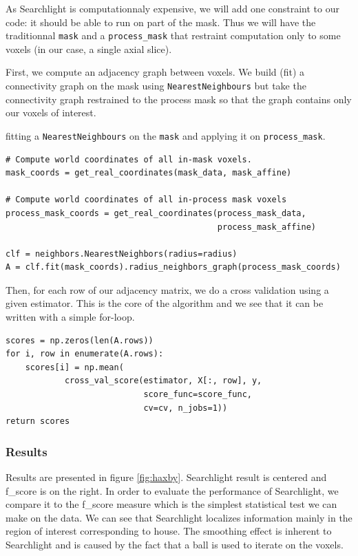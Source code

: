 \documentclass{frontiersSCNS} %
\begin{document}
As Searchlight is computationnaly expensive, we will add one constraint to our
code: it should be able to run on part of the mask. Thus we will have the
traditionnal \verb!mask! and a \verb!process_mask! that restraint computation
only to some voxels (in our case, a single axial slice).

First, we compute an adjacency graph between voxels. 
We build (fit) a connectivity graph on the mask using \texttt{NearestNeighbours}
but take the connectivity graph restrained to the
process mask so that the graph contains only our voxels of interest.

fitting a \verb!NearestNeighbours! on the \verb!mask! and applying it on
\verb!process_mask!.

\begin{lstlisting}
# Compute world coordinates of all in-mask voxels.
mask_coords = get_real_coordinates(mask_data, mask_affine)

# Compute world coordinates of all in-process mask voxels
process_mask_coords = get_real_coordinates(process_mask_data,
                                           process_mask_affine)

clf = neighbors.NearestNeighbors(radius=radius)
A = clf.fit(mask_coords).radius_neighbors_graph(process_mask_coords)
\end{lstlisting}

Then, for each row of our adjacency matrix, we do a cross validation using a
given estimator. This is the core of the algorithm and we see that it can be
written with a simple for-loop.

\begin{lstlisting}
scores = np.zeros(len(A.rows))
for i, row in enumerate(A.rows):
    scores[i] = np.mean(
            cross_val_score(estimator, X[:, row], y,
                            score_func=score_func,
                            cv=cv, n_jobs=1))
return scores
\end{lstlisting}

\subsubsection{Results}

Results are presented in figure \ref{fig:haxby}. Searchlight result is centered
and f\_score is on the right.
In order to evaluate the performance of Searchlight, we compare it to the
f\_score measure which is the simplest statistical test we can make on the data.
We can see that Searchlight localizes information mainly in the region of
interest corresponding to house. The smoothing effect is inherent to Searchlight
and is caused by the fact that a ball is used to iterate on the voxels.
\end{document}
